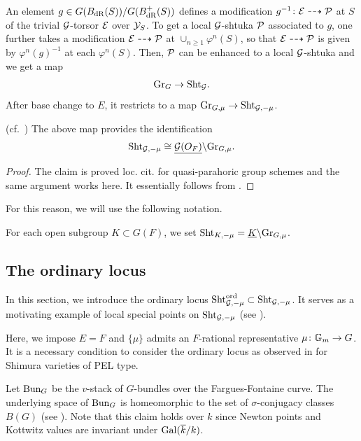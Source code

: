 \documentclass[12pt,reqno]{amsart}
\begin{document}
An element $g \in G(B_{\operatorname{dR}}(S)) / G(B^+_{\operatorname{dR}}(S))$ defines a modification $g^{-1} \colon {\mathcal{E}} \dashrightarrow {\mathcal{P}}$ at $S$ of the trivial ${\mathcal{G}}$-torsor ${\mathcal{E}}$ over ${\mathcal{Y}}_S$. To get a local ${\mathcal{G}}$-shtuka ${\mathcal{P}}$ associated to $g$, one further takes a modification ${\mathcal{E}} \dashrightarrow {\mathcal{P}}$ at $\cup_{n \geq 1} \varphi^n(S)$, so that ${\mathcal{E}} \dashrightarrow {\mathcal{P}}$ is given by $\varphi^n(g)^{-1}$ at each $\varphi^n(S)$. Then, ${\mathcal{P}}$ can be enhanced to a local ${\mathcal{G}}$-shtuka and we get a map
\[
    {\operatorname{Gr}}_{G} \to {\operatorname{Sht}}_{{\mathcal{G}}}. 
\]
After base change to $E$, it restricts to a map ${\operatorname{Gr}}_{G, \mu} \to {\operatorname{Sht}}_{{\mathcal{G}}, -\mu}$. 

\begin{prop}\textup{(cf.\ \cite[Corollary 3.3.9]{DHKZ26})} \label{prop:ShtvsGr}
    The above map provides the identification
    \[
        {\operatorname{Sht}}_{{\mathcal{G}}, -\mu} \cong {\underline{{\mathcal{G}}(O_F)}} \backslash {\operatorname{Gr}}_{G, \mu}. 
    \] 
\end{prop}
\begin{proof}
    The claim is proved loc. cit. for quasi-parahoric group schemes and the same argument works here. It essentially follows from \cite[Proposition 22.6.1]{SW20}. 
\end{proof}

For this reason, we will use the following notation. 

\begin{defi} \label{defi:local_shtuka_general_level}
    For each open subgroup $K \subset G(F)$, we set ${\operatorname{Sht}}_{K, -\mu} = \underline{K} \backslash {\operatorname{Gr}}_{G, \mu}$. 
\end{defi}

\subsection{The ordinary locus} \label{ssec:ordinary_locus}

In this section, we introduce the ordinary locus ${\operatorname{Sht}}_{{\mathcal{G}}, -\mu}^{\operatorname{ord}} \subset {\operatorname{Sht}}_{{\mathcal{G}}, -\mu}$. It serves as a motivating example of local special points on ${\operatorname{Sht}}_{{\mathcal{G}}, -\mu}$ (see ).  

Here, we impose $E=F$ and $\{ \mu \}$ admits an $F$-rational representative $\mu \colon \mathbb{G}_m \to G$. It is a necessary condition to consider the ordinary locus as observed in \cite[{}1.6.3]{Wed99} for Shimura varieties of PEL type. 

Let ${\operatorname{Bun}}_G$ be the $v$-stack of $G$-bundles over the Fargues-Fontaine curve. The underlying space of ${\operatorname{Bun}}_G$ is homeomorphic to the set of $\sigma$-conjugacy classes $B(G)$ (see \cite[Theorem 1.1]{Vie24}). Note that this claim holds over $k$ since Newton points and Kottwitz values are invariant under ${\operatorname{Gal}}({\overline{k}} / k)$. %
\end{document}
